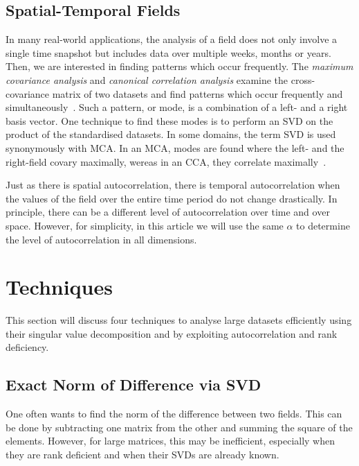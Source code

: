 \documentclass{acm_proc_article-sp}
\begin{document}
\subsection{Spatial-Temporal Fields}
\label{sec:Introduction Spatial-Temporal Fields}

In many real-world applications, the analysis of a field does not only involve a single time snapshot but includes data over multiple weeks, months or years. Then, we are interested in finding patterns which occur frequently. The \textit{maximum covariance analysis} and \textit{canonical correlation analysis} examine the cross-covariance matrix of two datasets and find patterns which occur frequently and simultaneously~\cite{Eshel2011, Storch1999}. Such a pattern, or mode, is a combination of a left- and a right basis vector. One technique to find these modes is to perform an SVD on the product of the standardised datasets. In some domains, the term SVD is used synonymously with MCA. In an MCA, modes are found where the left- and the right-field covary maximally, wereas in an CCA, they correlate maximally~\cite{Bretherton1992}.

Just as there is spatial autocorrelation, there is temporal autocorrelation when the values of the field over the entire time period do not change drastically. In principle, there can be a different level of autocorrelation over time and over space. However, for simplicity, in this article we will use the same $\alpha$ to determine the level of autocorrelation in all dimensions.

\section{Techniques}
\label{Techniques}

This section will discuss four techniques to analyse large datasets efficiently using their singular value decomposition and by exploiting autocorrelation and rank deficiency.

\subsection{Exact Norm of Difference via SVD}
\label{sec:Techniques Exact Norm of Difference via SVD}

One often wants to find the norm of the difference between two fields. This can be done by subtracting one matrix from the other and summing the square of the elements. However, for large matrices, this may be inefficient, especially when they are rank deficient and when their SVDs are already known.
\end{document}
